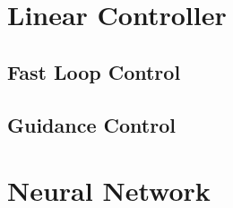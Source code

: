 \section{Linear Controller}
\label{section:linear_controller}

\subsection{Fast Loop Control}
\label{section:linear_controller/fast_loop}

\subsection{Guidance Control}
\label{section:linear_controller/guidance}

\section{Neural Network}
\label{section:NN}


